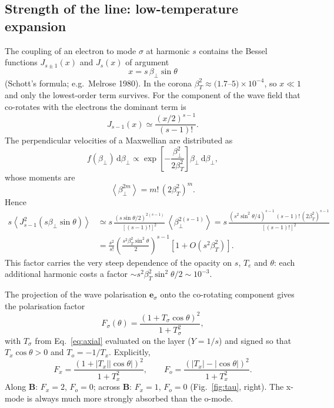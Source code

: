 \documentclass[11pt,a4paper]{article}
\newcommand{\vect}[1]{\bm{#1}}
\newcommand{\dd}{\mathrm{d}}
\begin{document}
\subsection{Strength of the line: low-temperature expansion}
The coupling of an electron to mode $\sigma$ at harmonic $s$ contains the Bessel functions
$J_{s\pm1}(x)$ and $J_s(x)$ of argument
\begin{equation}
  x=s\,\beta_\perp\sin\theta
\end{equation}
(Schott's formula; e.g.\ Melrose 1980). In the corona $\beta_T^2\approx(1.7$--$5)\times10^{-4}$,
so $x\ll1$ and only the lowest-order term survives. For the component of the wave field that
co-rotates with the electrons the dominant term is
\begin{equation}
  J_{s-1}(x)\simeq\frac{(x/2)^{s-1}}{(s-1)!}.
\end{equation}
The perpendicular velocities of a Maxwellian are distributed as
\begin{equation}
  f(\beta_\perp)\,\dd\beta_\perp\propto\exp\!\left[-\frac{\beta_\perp^2}{2\beta_T^2}\right]\beta_\perp\,\dd\beta_\perp,
\end{equation}
whose moments are
\begin{equation}
  \left\langle\beta_\perp^{2m}\right\rangle=m!\,\left(2\beta_T^2\right)^m .
\end{equation}
Hence
\begin{align}
  s\left\langle J_{s-1}^2(s\beta_\perp\sin\theta)\right\rangle
  &\simeq s\,\frac{(s\sin\theta/2)^{2(s-1)}}{[(s-1)!]^2}\,\left\langle\beta_\perp^{2(s-1)}\right\rangle
   = s\,\frac{(s^2\sin^2\theta/4)^{s-1}\,(s-1)!\,(2\beta_T^2)^{s-1}}{[(s-1)!]^2} \nonumber\\
  &= \frac{s^2}{s!}\left(\frac{s^2\beta_T^2\sin^2\theta}{2}\right)^{s-1}\left[1+O(s^2\beta_T^2)\right].
  \label{eq:bessel}
\end{align}
This factor carries the very steep dependence of the opacity on $s$, $T_e$ and $\theta$:
each additional harmonic costs a factor $\sim s^2\beta_T^2\sin^2\theta/2\sim10^{-3}$.

The projection of the wave polarisation $\vect e_\sigma$ onto the co-rotating component gives
the polarisation factor
\begin{equation}
  F_\sigma(\theta)=\frac{\left(1+T_\sigma\cos\theta\right)^2}{1+T_\sigma^2},
  \label{eq:F}
\end{equation}
with $T_\sigma$ from Eq.~\eqref{eq:axial} evaluated on the layer ($Y=1/s$) and signed so that
$T_x\cos\theta>0$ and $T_o=-1/T_x$. Explicitly,
\begin{equation}
  F_x=\frac{\left(1+|T_x||\cos\theta|\right)^2}{1+T_x^2},\qquad
  F_o=\frac{\left(|T_x|-|\cos\theta|\right)^2}{1+T_x^2}.
\end{equation}
Along $\vect B$: $F_x=2$, $F_o=0$; across $\vect B$: $F_x=1$, $F_o=0$ (Fig.~\ref{fig:tau}, right).
The x-mode is always much more strongly absorbed than the o-mode.
\end{document}
